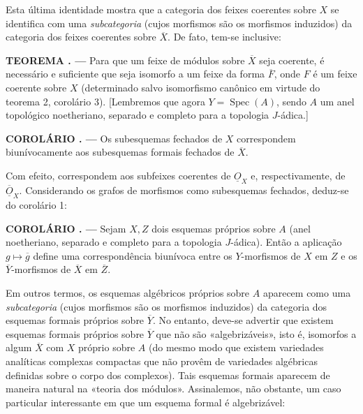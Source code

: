 \documentclass[11pt,twoside,openany]{book}
\numberwithin{equation}{section}
\newcommand{\src}[1]{%
  \phantomsection\hypertarget{src:#1}{}%
  \marginpar{\raggedleft\footnotesize\sffamily #1}%
}
\newcommand{\Osh}{\underline{O}}
\theoremstyle{plain}
\theoremstyle{definition}
\theoremstyle{remark}
\newcommand{\result}[2]{%
  \par\medskip\noindent\textbf{#1%
  \if\relax\detokenize{#2}\relax\else\space#2\fi. ---}\enspace
}
\newcommand{\FgaUnitKey}{frontmatter}
\renewcommand{\src}[1]{%
  \phantomsection\hypertarget{src:\FgaUnitKey:#1}{}%
  \marginpar{\raggedleft\footnotesize\sffamily #1}%
}
\begin{document}
\src{198}
Esta última identidade mostra que a categoria dos feixes coerentes sobre
$X$ se identifica com uma \emph{subcategoria} (cujos morfismos são os
morfismos induzidos) da categoria dos feixes coerentes sobre
$\overline X$. De fato, tem-se inclusive:

\result{TEOREMA}{3} Para que um feixe de módulos sobre $\overline X$ seja
coerente, é necessário e suficiente que seja isomorfo a um feixe da forma
$\overline F$, onde $F$ é um feixe coerente sobre $X$ (determinado salvo
isomorfismo canônico em virtude do teorema 2, corolário 3). [Lembremos que
agora $Y=\operatorname{Spec}(A)$, sendo $A$ um anel topológico noetheriano,
separado e completo para a topologia $J$-ádica.]

\result{COROLÁRIO}{1} Os subesquemas fechados de $X$ correspondem
biunívocamente aos subesquemas formais fechados de $\overline X$.

Com efeito, correspondem aos subfeixes coerentes de $\Osh_X$ e,
respectivamente, de $\overline{\Osh}_X$. Considerando os grafos de morfismos
como subesquemas fechados, deduz-se do corolário 1:

\result{COROLÁRIO}{2} Sejam $X,Z$ dois esquemas próprios sobre $A$ (anel
noetheriano, separado e completo para a topologia $J$-ádica). Então a
aplicação $g\longmapsto\overline g$ define uma correspondência biunívoca entre
os $Y$-morfismos de $X$ em $Z$ e os $\overline Y$-morfismos de $\overline X$
em $\overline Z$.

Em outros termos, os esquemas algébricos próprios sobre $A$ aparecem como uma
\emph{subcategoria} (cujos morfismos são os morfismos induzidos) da
categoria dos esquemas formais próprios sobre $\overline Y$. No entanto,
deve-se advertir que existem esquemas formais próprios sobre $\overline Y$ que
não são «algebrizáveis», isto é, isomorfos a algum $\overline X$ com $X$
próprio sobre $A$ (do mesmo modo que existem variedades analíticas complexas
compactas que não provêm de variedades algébricas definidas sobre o corpo
dos complexos). Tais esquemas formais aparecem de maneira natural na
«teoria dos módulos». Assinalemos, não obstante, um caso particular interessante em
que um esquema formal é algebrizável:
\end{document}
